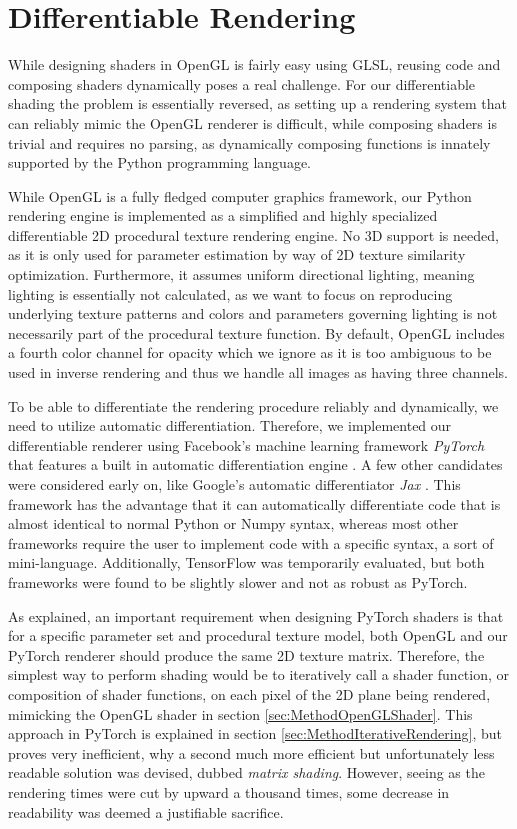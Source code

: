 \section{Differentiable Rendering}\label{sec:RenderingInDiPTeR}

While designing shaders in OpenGL is fairly easy using GLSL, reusing code and composing shaders dynamically poses a real challenge. For our differentiable shading the problem is essentially reversed, as setting up a rendering system that can reliably mimic the OpenGL renderer is difficult, while composing shaders is trivial and requires no parsing, as dynamically composing functions is innately supported by the Python programming language.

While OpenGL is a fully fledged computer graphics framework, our Python rendering engine is implemented as a simplified and highly specialized differentiable 2D procedural texture rendering engine. No 3D support is needed, as it is only used for parameter estimation by way of 2D texture similarity optimization. Furthermore, it assumes uniform directional lighting, meaning lighting is essentially not calculated, as we want to focus on reproducing underlying texture patterns and colors and parameters governing lighting is not necessarily part of the procedural texture function. By default, OpenGL includes a fourth color channel for opacity which we ignore as it is too ambiguous to be used in inverse rendering and thus we handle all images as having three channels.

To be able to differentiate the rendering procedure reliably and dynamically, we need to utilize automatic differentiation. Therefore, we implemented our differentiable renderer using Facebook's machine learning framework \textit{PyTorch} that features a built in automatic differentiation engine \cite{paszke_2019_pytorch}. A few other candidates were considered early on, like Google's automatic differentiator \textit{Jax} \cite{bradbury_2018_jax}. This framework has the advantage that it can automatically differentiate code that is almost identical to normal Python or Numpy syntax, whereas most other frameworks require the user to implement code with a specific syntax, a sort of mini-language. Additionally, TensorFlow was temporarily evaluated, but both frameworks were found to be slightly slower and not as robust as PyTorch.

As explained, an important requirement when designing PyTorch shaders is that for a specific parameter set and procedural texture model, both OpenGL and our PyTorch renderer should produce the same 2D texture matrix. Therefore, the simplest way to perform shading would be to iteratively call a shader function, or composition of shader functions, on each pixel of the 2D plane being rendered, mimicking the OpenGL shader in section \ref{sec:MethodOpenGLShader}. This approach in PyTorch is explained in section \ref{sec:MethodIterativeRendering}, but proves very inefficient, why a second much more efficient but unfortunately less readable solution was devised, dubbed \textit{matrix shading}. However, seeing as the rendering times were cut by upward a thousand times, some decrease in readability was deemed a justifiable sacrifice. 


